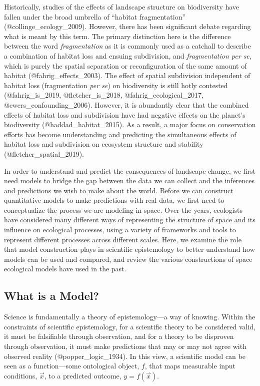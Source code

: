 Historically, studies of the effects of landscape structure on
biodiversity have fallen under the broad umbrella of ``habitat
fragmentation'' (@collinge\_ecology\_2009). However, there has been
significant debate regarding what is meant by this term. The primary
distinction here is the difference between the word \emph{fragmentation}
as it is commonly used as a catchall to describe a combination of
habitat loss and ensuing subdivision, and \emph{fragmentation per se},
which is purely the spatial separation or reconfiguration of the same
amount of habitat (@fahrig\_effects\_2003). The effect of spatial
subdivision independent of habitat loss (fragmentation \emph{per se}) on
biodiversity is still hotly contested (@fahrig\_is\_2019,
@fletcher\_is\_2018, @fahrig\_ecological\_2017,
@ewers\_confounding\_2006). However, it is abundantly clear that the
combined effects of habitat loss and subdivision have had negative
effects on the planet's biodiversity (@haddad\_habitat\_2015). As a
result, a major focus on conservation efforts has become understanding
and predicting the simultaneous effects of habitat loss and subdivision
on ecosystem structure and stability (@fletcher\_spatial\_2019).

In order to understand and predict the consequences of landscape change,
we first need models to bridge the gap between the data we can collect
and the inferences and predictions we wish to make about the world.
Before we can construct quantitative models to make predictions with
real data, we first need to conceptualize the process we are modeling in
space. Over the years, ecologists have considered many different ways of
representing the structure of space and its influence on ecological
processes, using a variety of frameworks and tools to represent
different processes across different scales. Here, we examine the role
that model construction plays in scientific epistemology to better
understand how models can be used and compared, and review the various
constructions of space ecological models have used in the past.

\hypertarget{what-is-a-model}{%
\subsection{What is a Model?}\label{what-is-a-model}}

Science is fundamentally a theory of epistemology---a way of knowing.
Within the constraints of scientific epistemology, for a scientific
theory to be considered valid, it must be falsifiable through
observation, and for a theory to be disproven through observation, it
must make predictions that may or may not agree with observed reality
(@popper\_logic\_1934). In this view, a scientific model can be seen as
a function---some ontological object, \(f\), that maps measurable input
conditions, \(\vec{x}\), to a predicted outcome, \(y=f(\vec{x})\).

